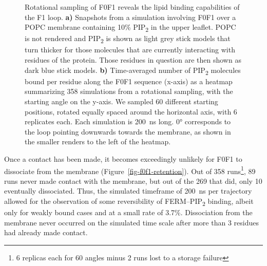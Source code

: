 \documentclass[
  twocolumn]{biophys-new-mod}
\begin{document}
\begin{figure}
\begin{minipage}[t]{\linewidth}
{{}

}

\subcaption{\label{fig-f0f1-ri-angle}~}
\end{minipage}%

\caption{\label{fig-loop-importance}Rotational sampling of F0F1 reveals
the lipid binding capabilities of the F1 loop. \textbf{a)} Snapshots
from a simulation involving F0F1 over a POPC membrane containing 10\%
PIP\textsubscript{2} in the upper leaflet. POPC is not rendered and
PIP\textsubscript{2} is shown as light grey stick models that turn
thicker for those molecules that are currently interacting with residues
of the protein. Those residues in question are then shown as dark blue
stick models. \textbf{b)} Time-averaged number of PIP\textsubscript{2}
molecules bound per residue along the F0F1 sequence (x-axis) as a
heatmap summarizing 358 simulations from a rotational sampling, with the
starting angle on the y-axis. We sampled 60 different starting
positions, rotated equally spaced around the horizontal axis, with 6
replicates each. Each simulation is 200~ns long. 0° corresponds to the
loop pointing downwards towards the membrane, as shown in the smaller
renders to the left of the heatmap.}

\end{figure}

Once a contact has been made, it becomes exceedingly unlikely for F0F1 to
dissociate from the membrane (Figure~\ref{fig-f0f1-retention}). Out of
358 runs\footnote{6 replicas each for 60 angles minus 2 runs lost to a
  storage failure}, 89 runs never made contact with the membrane, but
out of the 269 that did, only 10 eventually dissociated. Thus, the
simulated timeframe of 200~ns per trajectory allowed for the observation
of some reversibility of FERM--PIP\textsubscript{2} binding, albeit only
for weakly bound cases and at a small rate of 3.7\%. Dissociation from the membrane never occurred on the simulated time scale
after more than 3 residues had already made contact.
\end{document}

